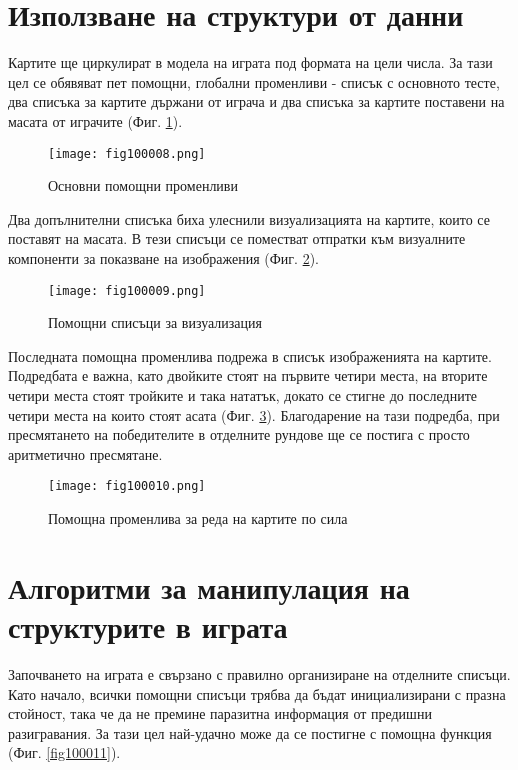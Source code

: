 \section{Използване на структури от данни}

Картите ще циркулират в модела на играта под формата на цели числа. За тази цел се обявяват пет помощни, глобални променливи - списък с основното тесте, два списъка за картите държани от играча и два списъка за картите поставени на масата от играчите (Фиг. \ref{fig100008}). 

\begin{figure}[H]
  \centering
  \texttt{[image: fig100008.png]}
  \caption{Основни помощни променливи}
\label{fig100008}
\end{figure}

Два допълнителни списъка биха улеснили визуализацията на картите, които се поставят на масата. В тези списъци се поместват отпратки към визуалните компоненти за показване на изображения (Фиг. \ref{fig100009}).

\begin{figure}[H]
  \centering
  \texttt{[image: fig100009.png]}
  \caption{Помощни списъци за визуализация}
\label{fig100009}
\end{figure}

Последната помощна променлива подрежа в списък изображенията на картите. Подредбата е важна, като двойките стоят на първите четири места, на вторите четири места стоят тройките и така нататък, докато се стигне до последните четири места на които стоят асата (Фиг. \ref{fig100010}). Благодарение на тази подредба, при пресмятането на победителите в отделните рундове ще се постига с просто аритметично пресмятане. 

\begin{figure}[H]
  \centering
  \texttt{[image: fig100010.png]}
  \caption{Помощна променлива за реда на картите по сила}
\label{fig100010}
\end{figure}

\section{Алгоритми за манипулация на структурите в играта}

Започването на играта е свързано с правилно организиране на отделните списъци. Като начало, всички помощни списъци трябва да бъдат инициализирани с празна стойност, така че да не премине паразитна информация от предишни разигравания. За тази цел най-удачно може да се постигне с помощна функция (Фиг. \ref{fig100011}).


